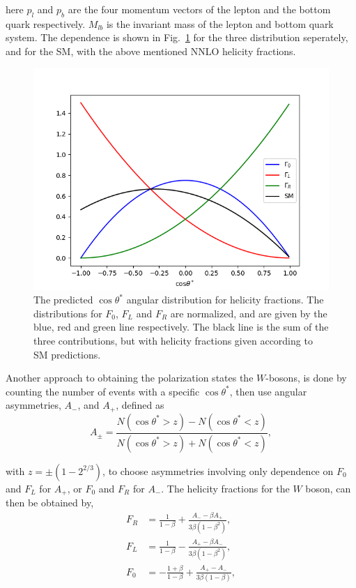 \documentclass[12pt,a4paper]{article}
\numberwithin{equation}{section}
\begin{document}
here $p_l$ and $p_b$ are the four momentum vectors of the lepton and the bottom
quark respectively. $M_{lb}$ is the invariant mass of the lepton and bottom
quark system. The dependence is shown in Fig.~\ref{fig:distributions} for the
three distribution seperately, and for the SM, with the above mentioned NNLO
helicity fractions.
\begin{figure}[H]
  \centering
	\includegraphics[width=0.7\linewidth]{figures/angular_dist.png}
	\caption{The predicted $\cos \theta^{*}$ angular distribution for helicity
    fractions. The distributions for $F_{0}$, $F_{L}$ and $F_{R}$ are
    normalized, and are given by the blue, red and green line respectively. The
    black line is the sum of the three contributions, but with helicity
    fractions given according to SM predictions.}\label{fig:distributions}
\end{figure}

Another approach to obtaining the polarization states the $W$-bosons, is done by
counting the number of events with a specific $\cos \theta^*$, then use angular
asymmetries, $A_-$, and $A_+$, defined as
\begin{equation}\label{Asymmetries}
  A_{\pm}=\frac{N(\cos \theta^* > z)-N(\cos \theta^* < z)}{N(\cos \theta^* > z)+N(\cos \theta^* < z)},
\end{equation}

with $z=\pm(1-2^{2/3})$, to choose asymmetries involving only dependence on
$F_0$ and $F_L$ for $A_+$, or $F_0$ and $F_R$ for $A_-$. The helicity fractions
for the $W$ boson, can then be obtained by,
\begin{align}
  F_R&=\frac{1}{1-\beta}+\frac{A_- - \beta A_+}{3\beta (1-\beta^2)},\\
  F_L&=\frac{1}{1-\beta}-\frac{A_+ - \beta A_-}{3\beta (1-\beta^2)},\\
  F_0&=-\frac{1+\beta}{1-\beta}+\frac{A_+ - A_-}{3\beta (1-\beta)},
\end{align}
\end{document}

